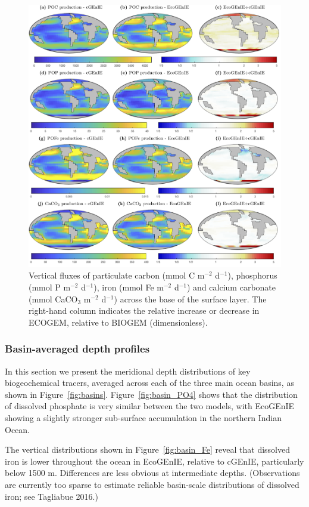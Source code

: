 \documentclass[gmd, manuscript]{copernicus}
\begin{document}
{\begin{figure}[htp]
\includegraphics[width=0.95\linewidth]{Final_figures/Fig_5.png}
\caption{Vertical fluxes of particulate carbon (mmol C m$^{-2}$ d$^{-1}$), phosphorus (mmol P m$^{-2}$ d$^{-1}$), iron (mmol Fe m$^{-2}$ d$^{-1}$) and calcium carbonate (mmol CaCO$_3$ m$^{-2}$ d$^{-1}$) across the base of the surface layer. The right-hand column indicates the relative increase or decrease in ECOGEM, relative to BIOGEM (dimensionless).}
\label{fig:particulates}
\end{figure}

\clearpage
\subsubsection{Basin-averaged depth profiles}

In this section we present the meridional depth distributions of key biogeochemical tracers, averaged across each of the three main ocean basins, as shown in Figure~\ref{fig:basins}. Figure~\ref{fig:basin_PO4} shows that the distribution of dissolved phosphate is very similar between the two models, with EcoGEnIE showing a slightly stronger sub-surface accumulation in the northern Indian Ocean. 

The vertical distributions shown in Figure~\ref{fig:basin_Fe} reveal that dissolved iron is lower throughout the ocean in EcoGEnIE, relative to cGEnIE, particularly below 1500 m. Differences are less obvious at intermediate depths. (Observations are currently too sparse to estimate reliable basin-scale distributions of dissolved iron; see Tagliabue 2016.)

}
\end{document}
